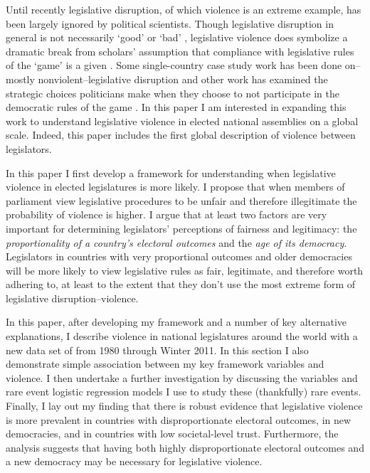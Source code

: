 \documentclass[a4paper]{article}\usepackage{graphicx, color}
\begin{document}
Until recently legislative disruption, of which violence is an extreme example, has been largely ignored by political scientists. Though legislative disruption in general is not necessarily `good' or `bad' \citep[see][for discussions of how disruption may be a `safety valve' in contexts where dissent is strongly curtailed]{Ostrow1996,Young2002}, legislative violence does symbolize a dramatic break from scholars' assumption that compliance with legislative rules of the `game' is a given \cite{Wolfe2004}. Some single-country case study work has been done on--mostly nonviolent--legislative disruption \cite[see][]{Armitage2013,Johnson2013,Ilie2013,Wolfe2004} and other work has examined the strategic choices politicians make when they choose to not participate in the democratic rules of the game \citep[e.g.][on election boycotts]{Beaulieu2008}. In this paper I am interested in expanding this work to understand legislative violence in elected national assemblies on a global scale. Indeed, this paper includes the first global description of violence between legislators. 

In this paper I first develop a framework for understanding when legislative violence in elected legislatures is more likely. I propose that when members of parliament view legislative procedures to be unfair and therefore illegitimate the probability of violence is higher. I argue that at least two factors are very important for determining legislators' perceptions of fairness and legitimacy: the \emph{proportionality of a country's electoral outcomes} and the \emph{age of its democracy}. Legislators in countries with very proportional outcomes and older democracies will be more likely to view legislative rules as fair, legitimate, and therefore worth adhering to, at least to the extent that they don't use the most extreme form of legislative disruption--violence. 

In this paper, after developing my framework and a number of key alternative explanations, I describe violence in national legislatures around the world with a new data set of from 1980 through Winter 2011. In this section I also demonstrate simple association between my key framework variables and violence. I then undertake a further investigation by discussing the variables and rare event logistic regression models \citep{KingRareEvents2001, KingRareEventsPA2001} I use to study these (thankfully) rare events. Finally, I lay out my finding that there is robust evidence that legislative violence is more prevalent in countries with disproportionate electoral outcomes, in new democracies, and in countries with low societal-level trust. Furthermore, the analysis suggests that having both highly disproportionate electoral outcomes and a new democracy may be necessary for legislative violence.
\end{document}
